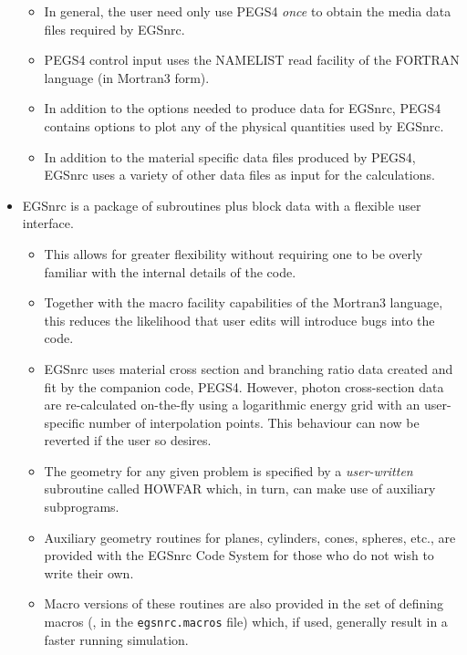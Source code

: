 \begin{itemize}
\begin{itemize}
  \item In general, the user need only use PEGS4 {\it once} to
  obtain the media data files required by EGSnrc.

  \item PEGS4 control input uses the NAMELIST read facility of
  the FORTRAN language (in Mortran3 form).

  \item In addition to the options needed to produce data for
  EGSnrc, PEGS4 contains options to plot any of the physical
  quantities used by EGSnrc.

  \item In addition to the material specific data files produced by PEGS4,
   EGSnrc uses a variety of other data files as input for the calculations.
\end{itemize}

\item EGSnrc is a package of subroutines plus block data with
a flexible user interface.

  \begin{itemize}
  \item This allows for greater flexibility without requiring
  one to be overly familiar with the internal details of the code.

  \item Together with the macro facility capabilities of the
  Mortran3 language, this reduces the likelihood that user edits
  will introduce bugs into the code.

  \item EGSnrc uses material cross section and branching ratio
  data created and fit by the companion code, PEGS4. However,
  photon cross-section data are re-calculated on-the-fly
  using a logarithmic energy grid with an user-specific number
  of interpolation points. This behaviour can now be reverted
  if the user so desires.

\item The geometry for any given problem is specified by a
{\it user-written} subroutine called HOWFAR which, in turn,
can make use of auxiliary subprograms.

  \item Auxiliary geometry routines for planes, cylinders,
  cones, spheres, etc., are provided with the EGSnrc Code System
  for those who do not wish to write their own.

  \item Macro versions of these routines are also provided in the
  set of defining macros (\ie, in the {\tt egsnrc.macros} file) which,
  if used, generally result in a faster running simulation.



\end{itemize}
\end{itemize}
